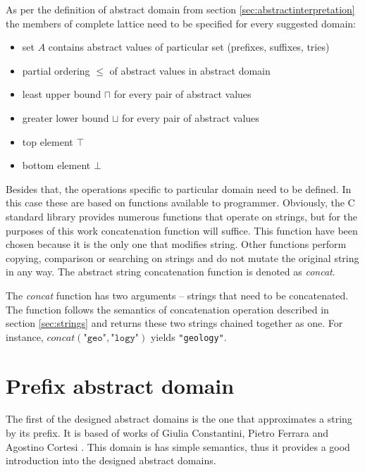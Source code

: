 \documentclass[12pt,final,oneside]{fithesis2}
\theoremstyle{definition}
\begin{document}
As per the definition of abstract domain from section
\ref{sec:abstractinterpretation} the members of complete lattice need to be
specified for every suggested domain:

\begin{itemize}

\item set $A$ contains abstract values of particular set (prefixes,
suffixes, tries)

\item partial ordering $\leq$ of abstract values in abstract domain

\item least upper bound $\sqcap$ for every pair of abstract values

\item greater lower bound $\sqcup$ for every pair of abstract values

\item top element $\top$

\item bottom element $\bot$

\end{itemize}

Besides that, the operations specific to particular domain need to be
defined. In this case these are based on functions available to programmer.
Obviously, the C standard library provides numerous functions that operate
on strings, but for the purposes of this work concatenation function will
suffice. This function have been chosen because it is the only one that
modifies string. Other functions perform copying, comparison or searching
on strings and do not mutate the original string in any way. The abstract
string concatenation function is denoted as \textit{concat}.

The \textit{concat} function has two arguments -- strings that need to be
concatenated. The function follows the semantics of concatenation
operation described in section \ref{sec:strings} and returns these two
strings chained together as one. For instance,
$\textit{concat}(\texttt{"geo"}, \texttt{"logy"})$ yields \texttt{"geology"}.


\section{Prefix abstract domain}

The first of the designed abstract domains is the one that approximates
a string by its prefix. It is based of works of Giulia Constantini,
Pietro Ferrara and Agostino Cortesi \cite{Constantini11-1}. This domain
is has simple semantics, thus it provides a good introduction into the
designed abstract domains.
\end{document}
